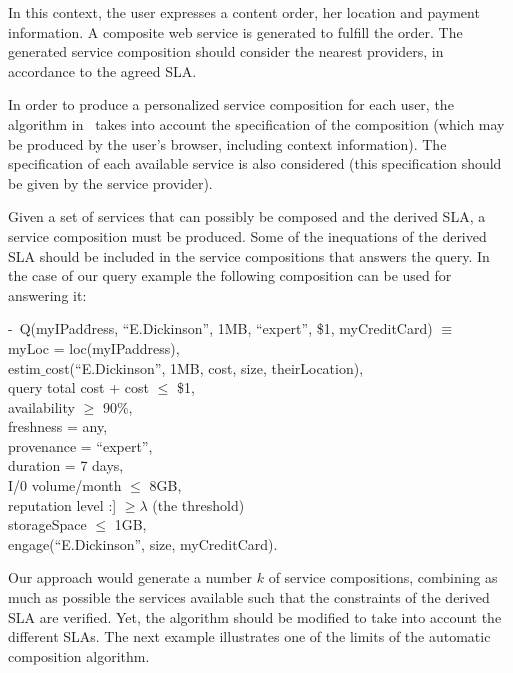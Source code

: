 In this context, the user  expresses a content order, her location and payment information. A composite web service is  generated to fulfill the order.
The generated service composition should consider the nearest providers, in accordance to the agreed SLA.

In order to produce a personalized service composition for each user, the algorithm in~\cite{CostaAMR13} takes into account the specification of the composition (which may be produced by the user's browser, including context information).
The specification of each available service is also considered (this specification should be given by the service provider).


Given a set of services that can possibly be composed and the derived SLA, a service composition must be produced.
Some of the inequations of the derived SLA should be included in the service compositions that answers the query.
In the case of our query example the following composition can be used for answering it:

\begin{footnotesize}
\sf
\begin{tabbing}
 -~Q(myIPad\=dress, ``E.Dickinson'', 1MB, ``expert'', \$1, myCreditCard) $\equiv$ \\
 \>  myLoc = loc(myIPaddress), \\
 \>  estim$\_$cost(``E.Dickinson'', 1MB, cost, size, theirLocation), \\
 \>  query total cost + cost $\leq$ \$1,\\
 \>  availability $\geq$ 90$\%$, \\
 \>  freshness = any, \\
 \>  provenance = ``expert'', \\
 \>  duration = 7 days, \\
 \>  I/0 volume/month $\leq$ 8GB, \\
 \>reputation level :] $\geq \lambda$ (the threshold) \\
 \>  storageSpace $\leq$ 1GB, \\
 \>  engage(``E.Dickinson'', size, myCreditCard).
 \end{tabbing} 
\end{footnotesize}

Our approach would generate a number $k$ of service compositions, combining as much as possible the services available such that the constraints of the derived SLA are verified. 
 Yet, the algorithm should be modified to take into account the different SLAs. The next example illustrates one of the limits of the automatic composition algorithm.

